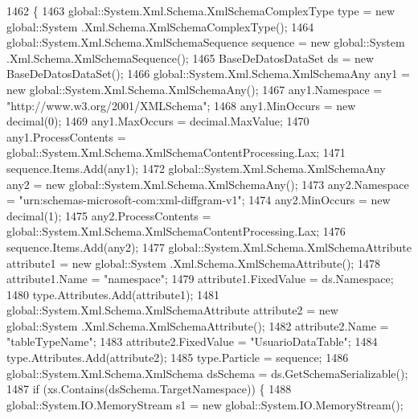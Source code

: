 \begin{DoxyCode}
1462                                                                                                            
                               \{
1463                 global::System.Xml.Schema.XmlSchemaComplexType type = \textcolor{keyword}{new} global::System
      .Xml.Schema.XmlSchemaComplexType();
1464                 global::System.Xml.Schema.XmlSchemaSequence sequence = \textcolor{keyword}{new} global::System
      .Xml.Schema.XmlSchemaSequence();
1465                 BaseDeDatosDataSet ds = \textcolor{keyword}{new} BaseDeDatosDataSet();
1466                 global::System.Xml.Schema.XmlSchemaAny any1 = \textcolor{keyword}{new} global::System.Xml.Schema.XmlSchemaAny();
1467                 any1.Namespace = \textcolor{stringliteral}{"http://www.w3.org/2001/XMLSchema"};
1468                 any1.MinOccurs = \textcolor{keyword}{new} decimal(0);
1469                 any1.MaxOccurs = decimal.MaxValue;
1470                 any1.ProcessContents = global::System.Xml.Schema.XmlSchemaContentProcessing.Lax;
1471                 sequence.Items.Add(any1);
1472                 global::System.Xml.Schema.XmlSchemaAny any2 = \textcolor{keyword}{new} global::System.Xml.Schema.XmlSchemaAny();
1473                 any2.Namespace = \textcolor{stringliteral}{"urn:schemas-microsoft-com:xml-diffgram-v1"};
1474                 any2.MinOccurs = \textcolor{keyword}{new} decimal(1);
1475                 any2.ProcessContents = global::System.Xml.Schema.XmlSchemaContentProcessing.Lax;
1476                 sequence.Items.Add(any2);
1477                 global::System.Xml.Schema.XmlSchemaAttribute attribute1 = \textcolor{keyword}{new} global::System
      .Xml.Schema.XmlSchemaAttribute();
1478                 attribute1.Name = \textcolor{stringliteral}{"namespace"};
1479                 attribute1.FixedValue = ds.Namespace;
1480                 type.Attributes.Add(attribute1);
1481                 global::System.Xml.Schema.XmlSchemaAttribute attribute2 = \textcolor{keyword}{new} global::System
      .Xml.Schema.XmlSchemaAttribute();
1482                 attribute2.Name = \textcolor{stringliteral}{"tableTypeName"};
1483                 attribute2.FixedValue = \textcolor{stringliteral}{"UsuarioDataTable"};
1484                 type.Attributes.Add(attribute2);
1485                 type.Particle = sequence;
1486                 global::System.Xml.Schema.XmlSchema dsSchema = ds.GetSchemaSerializable();
1487                 \textcolor{keywordflow}{if} (xs.Contains(dsSchema.TargetNamespace)) \{
1488                     global::System.IO.MemoryStream s1 = \textcolor{keyword}{new} global::System.IO.MemoryStream();

\end{DoxyCode}
